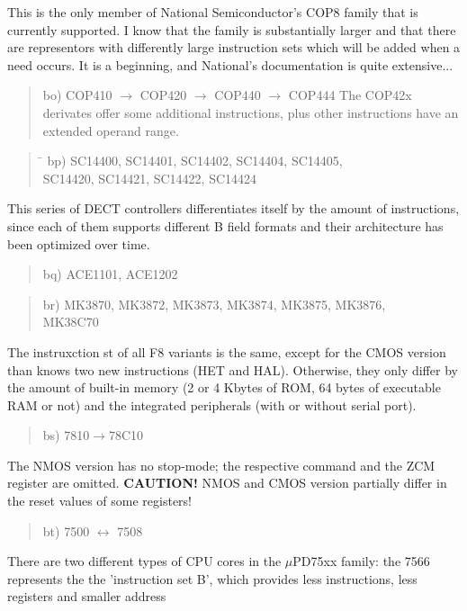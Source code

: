 \documentclass[12pt,twoside]{report}
\newcommand{\bb}[1]{{\bf #1}}
\begin{document}
This is the only member of National Semiconductor's COP8 family that
is currently supported.  I know that the family is substantially
larger and that there are representors with differently large
instruction sets which will be added when a need occurs.  It is a
beginning, and National's documentation is quite extensive...
\begin{quote}
bo) COP410 $\rightarrow$ COP420 $\rightarrow$ COP440 $\rightarrow$ COP444
The COP42x derivates offer some additional instructions, plus other
instructions have an extended operand range.
\end{quote}
\begin{quote}
\begin{tabbing}
\hspace{0.7cm} \= \kill
bp) \> SC14400, SC14401, SC14402, SC14404, SC14405, \\
    \> SC14420, SC14421, SC14422, SC14424 \\
\end{tabbing}
\end{quote}
This series of DECT controllers differentiates itself by the amount of
instructions, since each of them supports different B field formats and
their architecture has been optimized over time.
\begin{quote}
bq) ACE1101, ACE1202
\end{quote}
\begin{quote}
br) MK3870, MK3872, MK3873, MK3874, MK3875, MK3876, \\
    MK38C70
\end{quote}
The instruxction st of all F8 variants is the same, except for the
 CMOS version than knows two new instructions (HET and HAL).
Otherwise, they only differ by the amount of built-in memory (2 or
4 Kbytes of ROM, 64 bytes of executable RAM or not) and the
integrated peripherals (with or without serial port).
\begin{quote}
bs) 7810$\rightarrow$78C10
\end{quote}
The NMOS version has no stop-mode; the respective command and the ZCM
register are omitted.  \bb{CAUTION!}  NMOS and CMOS version partially
differ in the reset values of some registers!
\begin{quote}
bt) 7500 $\leftrightarrow$ 7508
\end{quote}
There are two different types of CPU cores in the $\mu$PD75xx
family: the 7566 represents the the 'instruction set B', which
provides less instructions, less registers and smaller address
\end{document}
